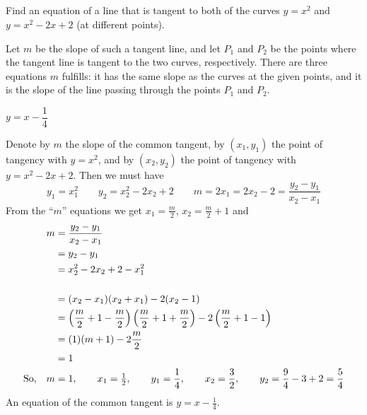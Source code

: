 \subsection*{\Application}



\begin{question}[2007H]
 Find an equation of a line that is tangent to both of the
curves $y = x^2$ and $y = x^2 - 2x + 2$ (at different points).
\end{question}
\begin{hint}
Let $m$ be the slope of such a tangent line, and let $P_1$ and $P_2$ be the points where the tangent line is tangent to the two curves, respectively. There are three equations $m$ fulfills: it has the same slope as the curves at the given points, and it is the slope of the line passing through the points $P_1$ and $P_2$.
\end{hint}
\begin{answer}
 $y=x-\dfrac{1}{4}$
\end{answer}
\begin{solution}
Denote by $m$ the slope of the common tangent, by $(x_1,y_1)$
the point of tangency with $y=x^2$, and by $(x_2,y_2)$ the point of tangency
with $y=x^2-2x+2$. Then we must have
$$
y_1=x_1^2\qquad
y_2=x_2^2-2x_2+2\qquad
m=2x_1=2x_2-2=\frac{y_2-y_1}{x_2-x_1}
$$
From the ``$m$'' equations we get $x_1=\frac{m}{2}$, $x_2=\frac{m}{2}+1$
and
\begin{align*}
m&=\frac{y_2-y_1}{x_2-x_1}\\
&=y_2-y_1\\
&=x_2^2-2x_2+2-x_1^2\\
\\& =(x_2-x_1)(x_2+x_1)-2(x_2-1)\\
&=\left(\frac{m}{2}+1-\frac{m}{2}\right)\left(\frac{m}{2}+1+\frac{m}{2}\right)
-2\left(\frac{m}{2}+1-1\right)
\\ &=(1)(m+1)-2\frac{m}{2}\\
 &=1\\
\mbox{So,}~~~m&=1,\qquad
x_1=\tfrac{1}{2},\qquad
y_1=\frac{1}{4},\qquad
x_2=\frac{3}{2},\qquad
y_2=\frac{9}{4}-3+2=\frac{5}{4}
\end{align*}
An equation of the common tangent is $y=x-\frac{1}{4}$.
\end{solution}



